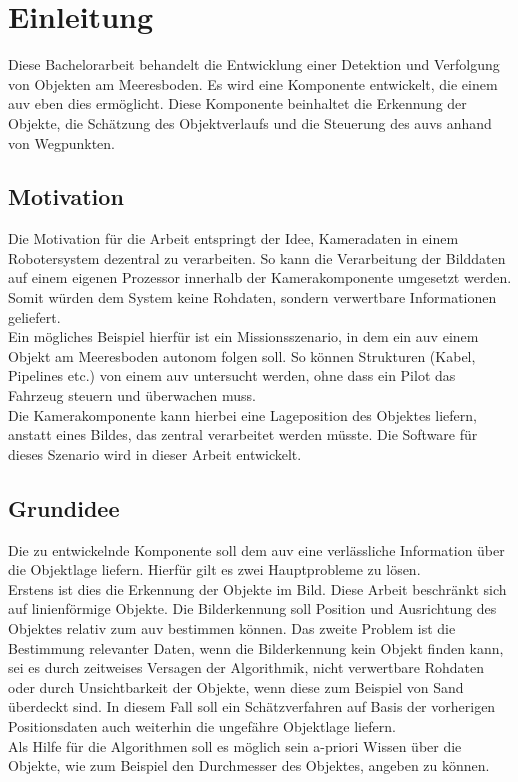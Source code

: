 \section{Einleitung}
Diese Bachelorarbeit behandelt die Entwicklung einer Detektion und Verfolgung von Objekten am Meeresboden. Es wird eine Komponente entwickelt, die einem \gls{auv} eben dies ermöglicht. Diese Komponente beinhaltet die Erkennung der Objekte, die Schätzung des Objektverlaufs und die Steuerung des \gls{auv}s anhand von Wegpunkten.
\subsection{Motivation}
Die Motivation für die Arbeit entspringt der Idee, Kameradaten in einem Robotersystem dezentral zu verarbeiten. So kann die Verarbeitung der Bilddaten auf einem eigenen Prozessor innerhalb der Kamerakomponente umgesetzt werden. Somit würden dem System keine Rohdaten, sondern verwertbare Informationen geliefert.\\
Ein mögliches Beispiel hierfür ist ein Missionsszenario, in dem ein \gls{auv} einem Objekt am Meeresboden autonom folgen soll. So können Strukturen (Kabel, Pipelines etc.) von einem \gls{auv} untersucht werden, ohne dass ein Pilot das Fahrzeug steuern und überwachen muss.\\
Die Kamerakomponente kann hierbei eine Lageposition des Objektes liefern, anstatt eines Bildes, das zentral verarbeitet werden müsste. Die Software für dieses Szenario wird in dieser Arbeit entwickelt.\\

\subsection{Grundidee}
Die zu entwickelnde Komponente soll dem \gls{auv} eine verlässliche Information über die Objektlage liefern. Hierfür gilt es zwei Hauptprobleme zu lösen.\\
Erstens ist dies die Erkennung der Objekte im Bild. Diese Arbeit beschränkt sich auf linienförmige Objekte. Die Bilderkennung soll Position und Ausrichtung des Objektes relativ zum \gls{auv} bestimmen können.
Das zweite Problem ist die Bestimmung relevanter Daten, wenn die Bilderkennung kein Objekt finden kann, sei es durch zeitweises Versagen der Algorithmik, nicht verwertbare Rohdaten oder durch Unsichtbarkeit der Objekte, wenn diese zum Beispiel von Sand überdeckt sind.
In diesem Fall soll ein Schätzverfahren auf Basis der vorherigen Positionsdaten auch weiterhin die ungefähre Objektlage liefern.\\
Als Hilfe für die Algorithmen soll es möglich sein a-priori Wissen über die Objekte, wie zum Beispiel den Durchmesser des Objektes, angeben zu können.
